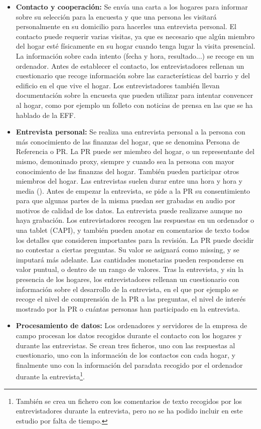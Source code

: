 \begin{itemize}
    \item \textbf{Contacto y cooperación:} Se envía una carta a los hogares para informar sobre su selección para la encuesta y que una persona les visitará personalmente en su domicilio para hacerles una entrevista personal. El contacto puede requerir varias visitas, ya que es necesario que algún miembro del hogar esté físicamente en su hogar cuando tenga lugar la visita presencial. La información sobre cada intento (fecha y hora, resultado...) se recoge en un ordenador. Antes de establecer el contacto, los entrevistadores rellenan un cuestionario que recoge información sobre las características del barrio y del edificio en el que vive el hogar. Los entrevistadores también llevan documentación sobre la encuesta que pueden utilizar para intentar convencer al hogar, como por ejemplo un folleto con noticias de prensa en las que se ha hablado de la EFF.
    \item \textbf{Entrevista personal:} Se realiza una entrevista personal a la persona con más conocimiento de las finanzas del hogar, que se denomina Persona de Referencia o PR. La PR puede ser miembro del hogar, o un representante del mismo, demoninado proxy, siempre y cuando sea la persona con mayor conocimiento de las finanzas del hogar. También pueden participar otros miembros del hogar. Las entrevistas suelen durar entre una hora y hora y media (\cite{effmethod2017}). Antes de empezar la entrevista, se pide a la PR su consentimiento para que algunas partes de la misma puedan ser grabadas en audio por motivos de calidad de los datos. La entrevista puede realizarse aunque no haya grabación. Los entrevistadores recogen las respuestas en un ordenador o una tablet (CAPI), y también pueden anotar en comentarios de texto todos los detalles que consideren importantes para la revisión. La PR puede decidir no contestar a ciertas preguntas. Su valor se asignará como missing, y se imputará más adelante. Las cantidades monetarias pueden responderse en valor puntual, o dentro de un rango de valores. Tras la entrevista, y sin la presencia de los hogares, los entrevistadores rellenan un cuestionario con información sobre el desarrollo de la entrevista, en el que por ejemplo se recoge el nivel de comprensión de la PR a las preguntas, el nivel de interés mostrado por la PR o cuántas personas han participado en la entrevista.
    \item \textbf{Procesamiento de datos:} Los ordenadores y servidores de la empresa de campo procesan los datos recogidos durante el contacto con los hogares y durante las entrevistas. Se crean tres ficheros, uno con las respuestas al cuestionario, uno con la información de los contactos con cada hogar, y finalmente uno con la información del paradata recogido por el ordenador durante la entrevista\footnote{También se crea un fichero con los comentarios de texto recogidos por los entrevistadores durante la entrevista, pero no se ha podido incluir en este estudio por falta de tiempo.}.

\end{itemize}
